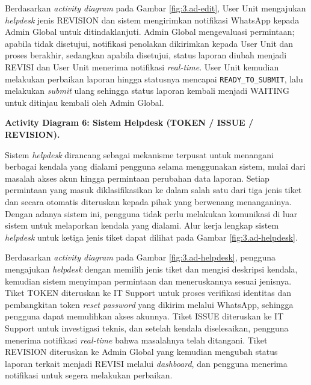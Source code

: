 Berdasarkan \textit{activity diagram} pada Gambar \ref{fig:3.ad-edit}, User Unit mengajukan \textit{helpdesk} jenis REVISION dan sistem mengirimkan notifikasi WhatsApp kepada Admin Global untuk ditindaklanjuti. Admin Global mengevaluasi permintaan; apabila tidak disetujui, notifikasi penolakan dikirimkan kepada User Unit dan proses berakhir, sedangkan apabila disetujui, status laporan diubah menjadi REVISI dan User Unit menerima notifikasi \textit{real-time}. User Unit kemudian melakukan perbaikan laporan hingga statusnya mencapai \texttt{READY\allowbreak\_TO\allowbreak\_SUBMIT}, lalu melakukan \textit{submit} ulang sehingga status laporan kembali menjadi WAITING untuk ditinjau kembali oleh Admin Global. \par


\textbf{Activity Diagram 6: Sistem Helpdesk (TOKEN / ISSUE / REVISION).} \par
Sistem \textit{helpdesk} dirancang sebagai mekanisme terpusat untuk menangani berbagai kendala yang dialami pengguna selama menggunakan sistem, mulai dari masalah akses akun hingga permintaan perubahan data laporan. Setiap permintaan yang masuk diklasifikasikan ke dalam salah satu dari tiga jenis tiket dan secara otomatis diteruskan kepada pihak yang berwenang menanganinya. Dengan adanya sistem ini, pengguna tidak perlu melakukan komunikasi di luar sistem untuk melaporkan kendala yang dialami. Alur kerja lengkap sistem \textit{helpdesk} untuk ketiga jenis tiket dapat dilihat pada Gambar \ref{fig:3.ad-helpdesk}. \par

Berdasarkan \textit{activity diagram} pada Gambar \ref{fig:3.ad-helpdesk}, pengguna mengajukan \textit{helpdesk} dengan memilih jenis tiket dan mengisi deskripsi kendala, kemudian sistem menyimpan permintaan dan meneruskannya sesuai jenisnya. Tiket TOKEN diteruskan ke IT Support untuk proses verifikasi identitas dan pembangkitan token \textit{reset password} yang dikirim melalui WhatsApp, sehingga pengguna dapat memulihkan akses akunnya. Tiket ISSUE diteruskan ke IT Support untuk investigasi teknis, dan setelah kendala diselesaikan, pengguna menerima notifikasi \textit{real-time} bahwa masalahnya telah ditangani. Tiket REVISION diteruskan ke Admin Global yang kemudian mengubah status laporan terkait menjadi REVISI melalui \textit{dashboard}, dan pengguna menerima notifikasi untuk segera melakukan perbaikan. \par

